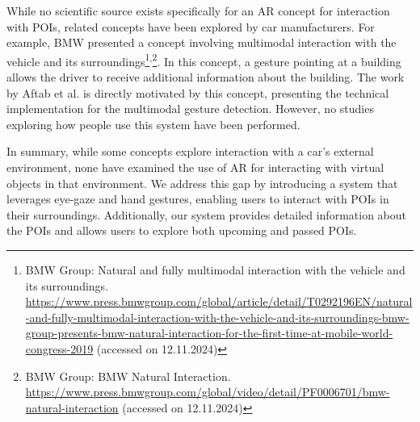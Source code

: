 While no scientific source exists specifically for an AR concept for interaction with POIs, related concepts have been explored by car manufacturers. For example, BMW presented a concept involving multimodal interaction with the vehicle and its surroundings\footnote{BMW Group: Natural and fully multimodal interaction with the vehicle and its surroundings. \url{https://www.press.bmwgroup.com/global/article/detail/T0292196EN/natural-and-fully-multimodal-interaction-with-the-vehicle-and-its-surroundings-bmw-group-presents-bmw-natural-interaction-for-the-first-time-at-mobile-world-congress-2019} (accessed on 12.11.2024)}\textsuperscript{,}\footnote{BMW Group: BMW Natural Interaction. \url{https://www.press.bmwgroup.com/global/video/detail/PF0006701/bmw-natural-interaction} (accessed on 12.11.2024)}. In this concept, a gesture pointing at a building allows the driver to receive additional information about the building. The work by Aftab et al. \cite{aftab2020point} is directly motivated by this concept, presenting the technical implementation for the multimodal gesture detection. However, no studies exploring how people use this system have been performed.

In summary, while some concepts explore interaction with a car's external environment, none have examined the use of AR for interacting with virtual objects in that environment. We address this gap by introducing a system that leverages eye-gaze and hand gestures, enabling users to interact with POIs in their surroundings. Additionally, our system provides detailed information about the POIs and allows users to explore both upcoming and passed POIs.
